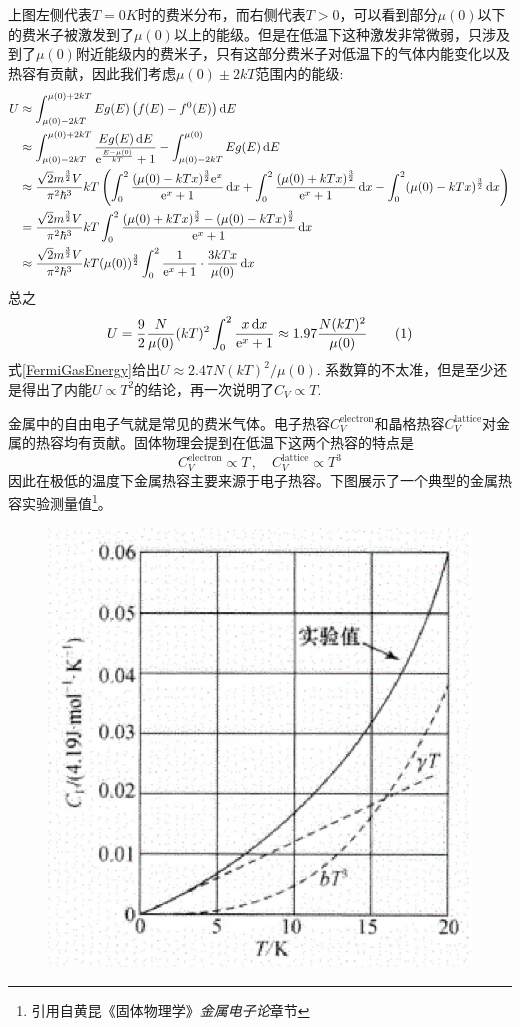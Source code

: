 \documentclass[]{article}
\begin{document}
	上图左侧代表$ T=0\unit{K} $时的费米分布，而右侧代表$ T>0 $，可以看到部分$ \mu(0) $以下的费米子被激发到了$ \mu(0) $以上的能级。但是在低温下这种激发非常微弱，只涉及到了$ \mu(0) $附近能级内的费米子，只有这部分费米子对低温下的气体内能变化以及热容有贡献，因此我们考虑$ \mu(0)\pm2kT $范围内的能级:
	\begin{align*}
	U&\approx\int_{\mu(0)-2kT}^{\mu(0)+2kT}Eg(E)\left(f(E)-f^0(E)\right)\diff E\\
	&\approx\int_{\mu(0)-2kT}^{\mu(0)+2kT}\frac{Eg(E)\diff E}{\ee^{\frac{E-\mu(0)}{kT}}+1}-\int_{\mu(0)-2kT}^{\mu(0)}Eg(E)\diff E\\
	&\approx \frac{\sqrt{2}m^{\frac 32}V}{\pi^2\hbar^3}kT\left(\int_{0}^{2}\frac{(\mu(0)-kTx)^{\frac 32}\ee^x}{\ee^x+1}\diff x+\int_0^2\frac{(\mu(0)+kTx)^{\frac 32}}{\ee^x+1}\diff x-\int_0^2(\mu(0)-kTx)^{\frac 32}\diff x\right)\\
	&=\frac{\sqrt{2}m^{\frac 32}V}{\pi^2\hbar^3}kT\int_0^2\frac{(\mu(0)+kTx)^{\frac 32}-(\mu(0)-kTx)^{\frac 32}}{\ee^x+1}\diff x\\
	&\approx\frac{\sqrt{2}m^{\frac 32}V}{\pi^2\hbar^3}kT(\mu(0))^{\frac 32}\int_0^2\frac{1}{\ee^x+1}\cdot\frac{3kTx}{\mu(0)}\diff x
	\end{align*}
	总之
	\[U=\frac 92\frac{N}{\mu(0)}(kT)^2\int_0^2\frac{x\diff x}{\ee^x+1}\approx1.97\frac{N(kT)^2}{\mu(0)}\taghere\]
	式\eqref{FermiGasEnergy}给出$ U\approx2.47N(kT)^2/\mu(0) $. 系数算的不太准，但是至少还是得出了内能$ U\propto T^2 $的结论，再一次说明了$ C_V\propto T $.
	
	
	金属中的自由电子气就是常见的费米气体。电子热容$ C_V^{\text{electron}} $和晶格热容$ C_V^{\text{lattice}} $对金属的热容均有贡献。固体物理会提到在低温下这两个热容的特点是
	\[C_V^{\text{electron}}\propto T\,,\quad C_V^{\text{lattice}}\propto T^3\]
	因此在极低的温度下金属热容主要来源于电子热容。下图展示了一个典型的金属热容实验测量值\footnote{引用自黄昆《固体物理学》\emph{金属电子论}章节}。
	\begin{figure}[h]
		\centering
		\includegraphics[width=.5\linewidth]{MetalCapacity}
	\end{figure}
	
\end{document}
